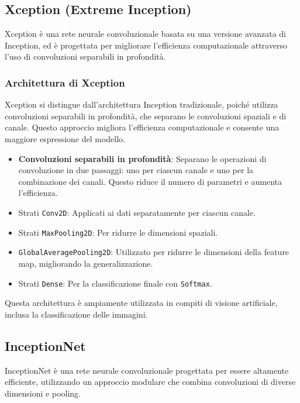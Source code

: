 \subsection{Xception (Extreme Inception)}

Xception è una rete neurale convoluzionale basata su una versione avanzata di Inception, ed è progettata per migliorare l'efficienza computazionale attraverso l'uso di convoluzioni separabili in profondità.

\subsubsection{Architettura di Xception}
Xception si distingue dall'architettura Inception tradizionale, poiché utilizza convoluzioni separabili in profondità, che separano le convoluzioni spaziali e di canale. Questo approccio migliora l'efficienza computazionale e consente una maggiore espressione del modello.
\begin{itemize}
    \item \textbf{Convoluzioni separabili in profondità}: Separano le operazioni di convoluzione in due passaggi: uno per ciascun canale e uno per la combinazione dei canali. Questo riduce il numero di parametri e aumenta l'efficienza.
    \item Strati \texttt{Conv2D}: Applicati ai dati separatamente per ciascun canale.
    \item Strati \texttt{MaxPooling2D}: Per ridurre le dimensioni spaziali.
    \item \texttt{GlobalAveragePooling2D}: Utilizzato per ridurre le dimensioni della feature map, migliorando la generalizzazione.
    \item Strati \texttt{Dense}: Per la classificazione finale con \texttt{Softmax}.
\end{itemize}
Questa architettura è ampiamente utilizzata in compiti di visione artificiale, inclusa la classificazione delle immagini.

\subsection{InceptionNet}

InceptionNet è una rete neurale convoluzionale progettata per essere altamente efficiente, utilizzando un approccio modulare che combina convoluzioni di diverse dimensioni e pooling.

